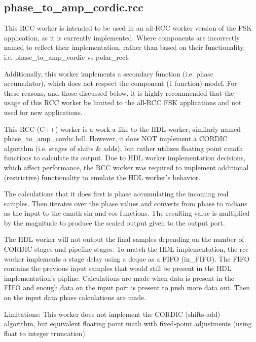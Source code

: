 \documentclass{article}
\def\comp{phase\_to\_amp\_cordic}
\begin{document}
\subsection*{\comp.rcc}
\begin{flushleft}
This RCC worker is intended to be used in an all-RCC worker version of the FSK application,
as it is currently implemented.  Where components are incorrectly named to reflect their implementation, rather than based on their functionality, i.e. phase\_to\_amp\_cordic vs polar\_rect.\medskip

Additionally, this worker implements a secondary function (i.e. phase accumulator), which
does not respect the component (1 function) model.
For these reasons, and those discussed below, it is highly recommended that the usage
of this RCC worker be limited to the all-RCC FSK applications and not used for new applications.\medskip

This RCC (C++) worker is a work-a-like to the HDL worker, similarly named phase\_to\_amp\_cordic.hdl.
However, it does NOT implement a CORDIC algorithm (i.e. stages of shifts \& adds),
but rather utilizes floating point cmath functions to calculate its output.
Due to HDL worker implementation decisions, which affect performance, the RCC worker
was required to implement additional (restrictive) functionality to emulate the HDL worker's
behavior.\medskip

The calculations that it does first is phase accumulating the incoming real samples. 
Then iterates over the phase values and converts from phase to radians as the input to the cmath sin and cos functions.
The resulting value is multiplied by the magnitude to produce the scaled output given to the output port.\medskip

The HDL worker will not output the final samples depending on the number of CORDIC stages and pipeline stages. 
To match the HDL implementation, the rcc worker implements a stage delay using a deque as a FIFO (in\_FIFO).
The FIFO contains the previous input samples that would still be present in the HDL implementation's pipline. 
Calculations are made when data is present in the FIFO and enough data on the input port is present to push more data out.
Then on the input data phase calculations are made.\medskip

Limitations:  
This worker does not implement the CORDIC (shifts-add) algorithm, 
but equivalent floating point math with fixed-point adjustments (using float to integer truncation)\medskip
\end{flushleft}
\end{document}

